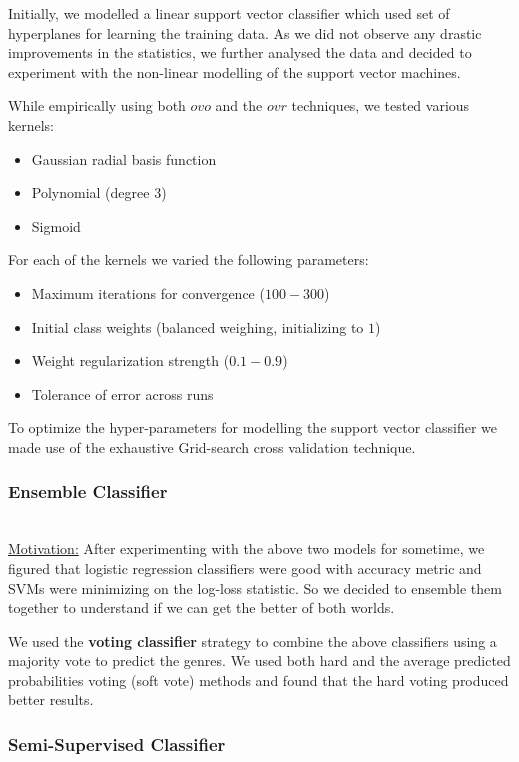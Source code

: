 \documentclass[fleqn,10pt]{SelfArx} %
\begin{document}
Initially, we modelled a linear support vector classifier which used set of hyperplanes for learning the training data. As we did not observe any drastic improvements in the statistics, we further analysed the data and decided to experiment with the non-linear modelling of the support vector machines.

While empirically using both $ovo$ and the $ovr$ techniques, we tested various kernels:
\begin{itemize}
  \item Gaussian radial basis function
  \item Polynomial (degree 3)
  \item Sigmoid
\end{itemize}

For each of the kernels we varied the following parameters:
\begin{itemize}
  \item Maximum iterations for convergence ($100-300$)
  \item Initial class weights (balanced weighing, initializing to $1$)
  \item Weight regularization strength ($0.1-0.9$)
  \item Tolerance of error across runs
\end{itemize}

To optimize the hyper-parameters for modelling the support vector classifier we made use of the exhaustive Grid-search cross validation technique.
\subsubsection{Ensemble Classifier}~\\
\underline{Motivation:} After experimenting with the above two models for sometime, we figured that logistic regression classifiers were good with accuracy metric and SVMs were minimizing on the log-loss statistic. So we decided to ensemble them together to understand if we can get the better of both worlds.

We used the \textbf{voting classifier} strategy to combine the above classifiers using a majority vote to predict the genres. We used both hard and the average predicted probabilities voting (soft vote) methods and found that the hard voting produced better results.

\subsubsection{Semi-Supervised Classifier}~\\
\end{document}
